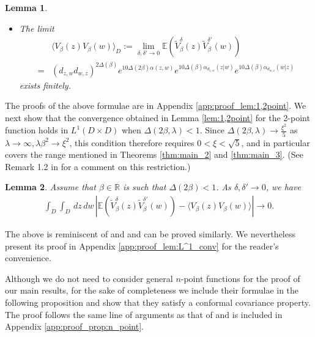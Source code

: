 \documentclass[a4paper, 11pt, reqno]{amsart}
\theoremstyle{definition} \newtheorem{defn}{Definition}[section]
\theoremstyle{remark} \newtheorem{rem}[defn]{Remark}
\theoremstyle{remark} \newtheorem*{rem*}{Remark}
\theoremstyle{plain} \newtheorem{thm}[defn]{Theorem}
\theoremstyle{plain} \newtheorem{lem}[defn]{Lemma}
\theoremstyle{plain} \newtheorem{prop}[defn]{Proposition}
\theoremstyle{plain} \newtheorem{cor}[defn]{Corollary}
\theoremstyle{remark} \newtheorem{exm}[defn]{\textbf{Example}}
\theoremstyle{remark} \newtheorem{exms}[defn]{\textbf{Examples}}
\theoremstyle{remark} \newtheorem*{bl}{}
\numberwithin{equation}{section} %
\newcommand{\x}{\times}
\newcommand{\R}{\mathbb{R}}
\newcommand{\E}{\mathbb{E}}
\begin{document}
\begin{lem}
\begin{itemize}
            \item[(iv)] The limit
			\begin{align}\label{eq:conv_2_pt_0}
				&\langle V_{\beta}(z) V_{\beta}(w) \rangle_D := \lim_{\delta, \delta' \to 0} \E( \tilde{V}^{\delta}_{\beta}(z) \tilde{V}^{\delta'}_{\beta}(w)) 			
				\nonumber \\
				= & (d_{z,w}d_{w,z})^{2 \Delta(\beta)}	 e^{10 \Delta(2\beta)  \alpha(z,w) } e^{10 \Delta(\beta)\alpha_{d_{z,w}}(z|w)} e^{10 \Delta(\beta)\alpha_{d_{w,z}}(w|z)}			
			\end{align}
			exists finitely. 
		\end{itemize}		       
	\end{lem}	
	
	The proofs of the above formulae are in Appendix \ref{app:proof_lem:1,2point}. We next show that the convergence obtained in Lemma \ref{lem:1,2point} for the 2-point function holds in $L^1(D\x D)$ when $\Delta(2\beta, \lambda)<1$. Since $\Delta(2\beta, \lambda) \to  \frac{\xi^2}{5}$ 
        as $\lambda \to \infty, \lambda \beta^2 \to \xi^2$, this condition therefore requires $0<\xi<\sqrt{5}$, and in particular covers the range mentioned in Theorems \ref{thm:main_2}  and \ref{thm:main_3}. (See Remark 1.2 in \cite{cgpr21} for a comment on this restriction.) 	
	\begin{lem}\label{lem:L^1_conv}
		Assume that $\beta \in \R$ is such that $\Delta(2\beta)  < 1$. As $\delta,\delta' \to 0$, we have
		\begin{align}\label{eq:L^1_conv_0}
			\int_D \int_D \, dz \, dw\, |\E ( \tilde{V}^{\delta}_{\beta}(z) \tilde{V}^{\delta'}_{\beta}(w)) - \langle V_{\beta}(z) V_{\beta}(w) \rangle | \to 0.
		\end{align}
	\end{lem}
	   The above is reminiscent of \cite[Theorem 3.3]{cgpr21} and \cite[Proposition 5.3]{vcl18} and can be proved similarly. We nevertheless present its proof in Appendix \ref{app:proof_lem:L^1_conv} for the reader's convenience. 
       
       Although we do not need to consider general $n$-point functions for the proof of our main results, for the sake of completeness we include their formulae in the following proposition and show that they satisfy a conformal covariance property. The proof follows the same line of arguments as that of \cite[Theorem 4.1]{cgk16} and is included in Appendix \ref{app:proof_prop:n_point}.
	
\end{document}
